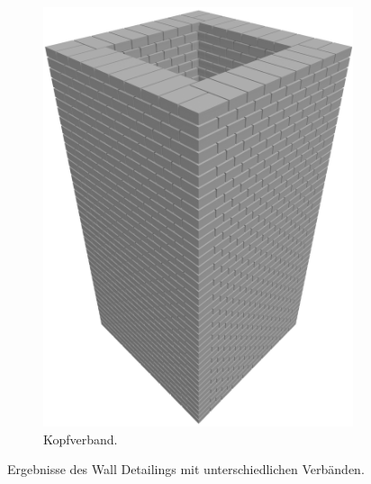 \begin{figure}[htb]
\begin{subfigure}[b]{0.3\columnwidth}
      \includegraphics[width=\columnwidth]{fig/scenario1_render_headbond.png}
      \caption{Kopfverband.}\label{fig:poc:render_headbond}
    \end{subfigure}
    \caption{Ergebnisse des Wall Detailings mit unterschiedlichen Verbänden.}\label{fig:poc:result_scenario1}
\end{figure}

